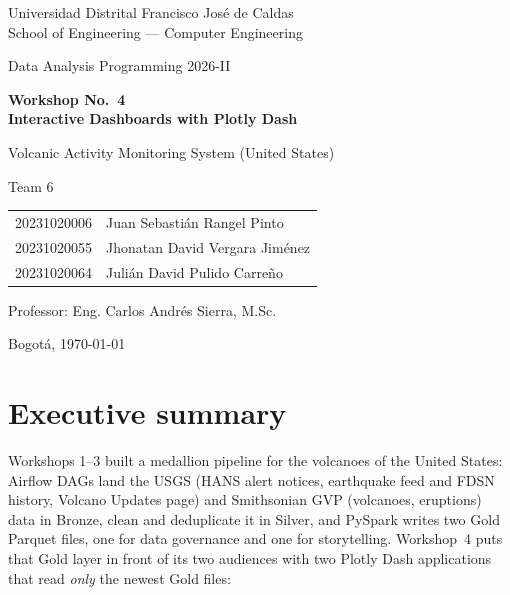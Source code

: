 \documentclass[11pt,a4paper]{article}
\renewcommand{\_}{\textunderscore\allowbreak}
\begin{document}
\begin{titlepage}
\centering
{\large Universidad Distrital Francisco José de Caldas\\ School of Engineering --- Computer Engineering\par}
\vspace{1.2cm}
{\Large Data Analysis Programming 2026-II\par}
\vspace{1.5cm}
{\huge\bfseries Workshop No.~4\\[4pt] Interactive Dashboards with Plotly Dash\par}
\vspace{0.8cm}
{\Large Volcanic Activity Monitoring System (United States)\par}
\vspace{1.5cm}
{\large Team 6\par}
\vspace{0.4cm}
\begin{tabular}{ll}
20231020006 & Juan Sebastián Rangel Pinto\\
20231020055 & Jhonatan David Vergara Jiménez\\
20231020064 & Julián David Pulido Carreño\\
\end{tabular}
\vfill
{\large Professor: Eng. Carlos Andrés Sierra, M.Sc.\par}
\vspace{0.3cm}
{\large Bogotá, \today\par}
\end{titlepage}

\tableofcontents
\clearpage

\section{Executive summary}\label{sec:summary}

Workshops 1--3 built a medallion pipeline for the volcanoes of the United States: Airflow DAGs land
the USGS (HANS alert notices, earthquake feed and FDSN history, Volcano Updates page) and Smithsonian GVP
(volcanoes, eruptions) data in Bronze, clean and deduplicate it in Silver, and PySpark writes two Gold
Parquet files, one for data governance and one for storytelling. Workshop~4 puts that Gold layer in front
of its two audiences with two Plotly Dash applications that read \emph{only} the newest Gold files:
\end{document}
